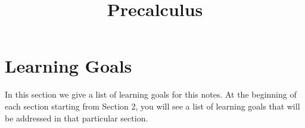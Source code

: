 \documentclass[10pt,]{article}
\title{Precalculus}
\date{}
\theoremstyle{plain}
\theoremstyle{definition}
\numberwithin{equation}{section}
\begin{document}
\hypertarget{index}{}
\maketitle
\thispagestyle{empty}
\typeout{************************************************}
\typeout{************************************************}
\section[{Learning Goals}]{Learning Goals}\label{section-clg}
\hypertarget{p-1}{}%
In this section we give a list of learning goals for this notes. At the beginning of each section starting from Section 2, you will see a list of learning goals that will be addressed in that particular section.%
\leavevmode%
\end{document}
